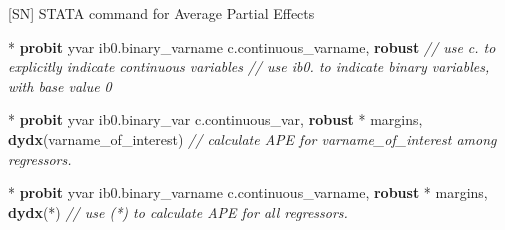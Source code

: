 \documentclass[
  10pt,
  ignorenonframetext,
]{beamer}
\newenvironment{Shaded}{\begin{snugshade}}{\end{snugshade}}
\newcommand{\CommentTok}[1]{\textcolor[rgb]{0.56,0.35,0.01}{\textit{#1}}}
\newcommand{\KeywordTok}[1]{\textcolor[rgb]{0.13,0.29,0.53}{\textbf{#1}}}
\newcommand{\NormalTok}[1]{#1}
\begin{document}
\begin{frame}[fragile]{{[}SN{]} STATA command for Average Partial
Effects}
\protect\hypertarget{sn-stata-command-for-average-partial-effects}{}
\small

\begin{Shaded}
\begin{Highlighting}[]
\NormalTok{* }\KeywordTok{probit}\NormalTok{ yvar ib0.binary\_varname c.continuous\_varname, }\KeywordTok{robust}
\CommentTok{// use \textquotesingle{}c.\textquotesingle{} to explicitly indicate continuous variables}
\CommentTok{// use \textquotesingle{}ib0.\textquotesingle{} to indicate binary variables, with base value 0}
\end{Highlighting}
\end{Shaded}

\begin{Shaded}
\begin{Highlighting}[]
\NormalTok{* }\KeywordTok{probit}\NormalTok{ yvar ib0.binary\_var c.continuous\_var, }\KeywordTok{robust}
\NormalTok{* margins, }\KeywordTok{dydx}\NormalTok{(varname\_of\_interest)}
\CommentTok{// calculate APE for varname\_of\_interest among regressors.}
\end{Highlighting}
\end{Shaded}

\begin{Shaded}
\begin{Highlighting}[]
\NormalTok{* }\KeywordTok{probit}\NormalTok{ yvar ib0.binary\_varname c.continuous\_varname, }\KeywordTok{robust}
\NormalTok{* margins, }\KeywordTok{dydx}\NormalTok{(*)}
\CommentTok{// use (*) to calculate APE for all regressors.}
\end{Highlighting}
\end{Shaded}
\end{frame}
\end{document}
